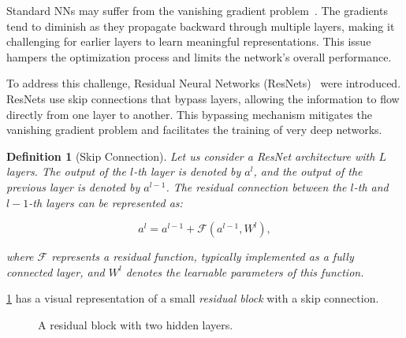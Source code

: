 \documentclass[ppgc,diss,english]{iiufrgs}
\newtheorem{definition}{Definition}
\begin{document}
Standard NNs may suffer from the vanishing gradient problem~\cite{Bengio.etal/1994}. The gradients tend to diminish as they propagate backward through multiple layers, making it challenging for earlier layers to learn meaningful representations. This issue hampers the optimization process and limits the network's overall performance.

To address this challenge, Residual Neural Networks (ResNets)~\cite{He.etal/2016} were introduced. ResNets use skip connections that bypass layers, allowing the information to flow directly from one layer to another. This bypassing mechanism mitigates the vanishing gradient problem and facilitates the training of very deep networks.

\begin{definition}[Skip Connection]
Let us consider a ResNet architecture with $L$ layers. The output of the $l$-th layer is denoted by $a^{l}$, and the output of the previous layer is denoted by $a^{l-1}$. The residual connection between the $l$-th and $l-1$-th layers can be represented as:

$$a^{l} = a^{l-1} + \mathcal{F}(a^{l-1}, W^{l}),$$

where $\mathcal{F}$ represents a residual function, typically implemented as a fully connected layer, and $W^{l}$ denotes the learnable parameters of this function.
\end{definition}

\cref{fig:residual-block} has a visual representation of a small \emph{residual block} with a skip connection.

\begin{figure}[tb]
\caption[A residual block]{A residual block with two hidden layers.}
\vspace{\baselineskip}
\centering
{}
\label{fig:residual-block}
\end{figure}
\end{document}
